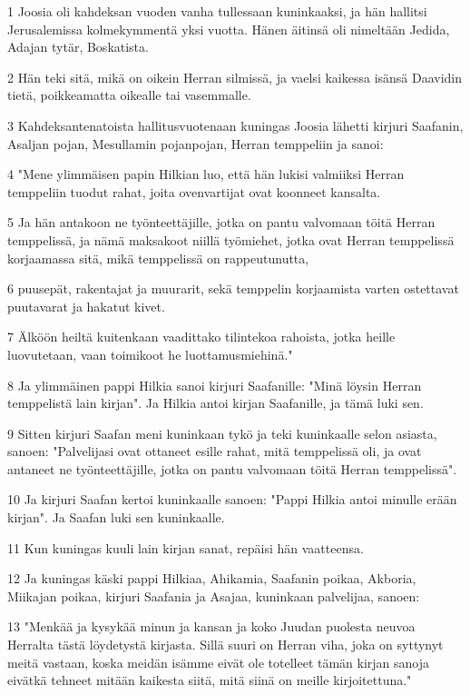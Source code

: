 \par 1 Joosia oli kahdeksan vuoden vanha tullessaan kuninkaaksi, ja hän hallitsi Jerusalemissa kolmekymmentä yksi vuotta. Hänen äitinsä oli nimeltään Jedida, Adajan tytär, Boskatista.
\par 2 Hän teki sitä, mikä on oikein Herran silmissä, ja vaelsi kaikessa isänsä Daavidin tietä, poikkeamatta oikealle tai vasemmalle.
\par 3 Kahdeksantenatoista hallitusvuotenaan kuningas Joosia lähetti kirjuri Saafanin, Asaljan pojan, Mesullamin pojanpojan, Herran temppeliin ja sanoi:
\par 4 "Mene ylimmäisen papin Hilkian luo, että hän lukisi valmiiksi Herran temppeliin tuodut rahat, joita ovenvartijat ovat koonneet kansalta.
\par 5 Ja hän antakoon ne työnteettäjille, jotka on pantu valvomaan töitä Herran temppelissä, ja nämä maksakoot niillä työmiehet, jotka ovat Herran temppelissä korjaamassa sitä, mikä temppelissä on rappeutunutta,
\par 6 puusepät, rakentajat ja muurarit, sekä temppelin korjaamista varten ostettavat puutavarat ja hakatut kivet.
\par 7 Älköön heiltä kuitenkaan vaadittako tilintekoa rahoista, jotka heille luovutetaan, vaan toimikoot he luottamusmiehinä."
\par 8 Ja ylimmäinen pappi Hilkia sanoi kirjuri Saafanille: "Minä löysin Herran temppelistä lain kirjan". Ja Hilkia antoi kirjan Saafanille, ja tämä luki sen.
\par 9 Sitten kirjuri Saafan meni kuninkaan tykö ja teki kuninkaalle selon asiasta, sanoen: "Palvelijasi ovat ottaneet esille rahat, mitä temppelissä oli, ja ovat antaneet ne työnteettäjille, jotka on pantu valvomaan töitä Herran temppelissä".
\par 10 Ja kirjuri Saafan kertoi kuninkaalle sanoen: "Pappi Hilkia antoi minulle erään kirjan". Ja Saafan luki sen kuninkaalle.
\par 11 Kun kuningas kuuli lain kirjan sanat, repäisi hän vaatteensa.
\par 12 Ja kuningas käski pappi Hilkiaa, Ahikamia, Saafanin poikaa, Akboria, Miikajan poikaa, kirjuri Saafania ja Asajaa, kuninkaan palvelijaa, sanoen:
\par 13 "Menkää ja kysykää minun ja kansan ja koko Juudan puolesta neuvoa Herralta tästä löydetystä kirjasta. Sillä suuri on Herran viha, joka on syttynyt meitä vastaan, koska meidän isämme eivät ole totelleet tämän kirjan sanoja eivätkä tehneet mitään kaikesta siitä, mitä siinä on meille kirjoitettuna."
